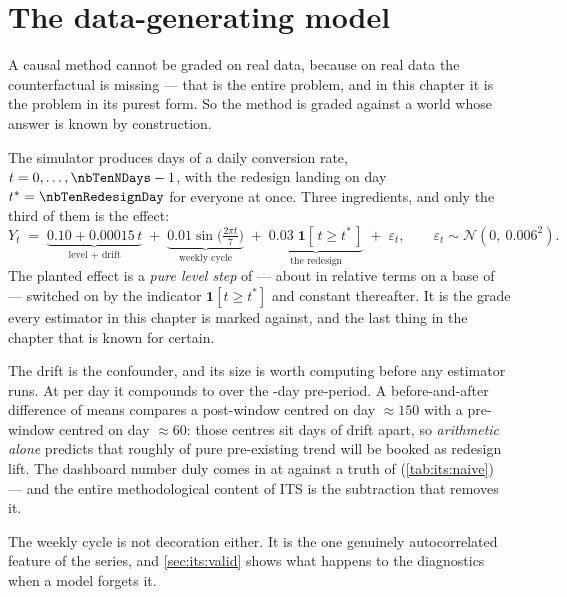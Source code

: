 \section{The data-generating model}
\label{sec:its:dgm}

A causal method cannot be graded on real data, because on real data the counterfactual is missing
--- that is the entire problem, and in this chapter it is the problem in its purest form. So the
method is graded against a world whose answer is known by construction.

The simulator produces \nbTenNDays{} days of a daily conversion rate,
$t = 0, \dots, \nbTenNDays-1$, with the redesign landing on day $t^{*} = \nbTenRedesignDay$ for
everyone at once. Three ingredients, and only the third of them is the effect:
%
\begin{equation}
  Y_t \;=\; \underbrace{0.10 + 0.00015\,t}_{\text{level {+} drift}}
        \;+\; \underbrace{0.01 \sin\!\Big(\tfrac{2\pi t}{7}\Big)}_{\text{weekly cycle}}
        \;+\; \underbrace{0.03\;\mathbf 1[\,t \ge t^{*}\,]}_{\text{the redesign}}
        \;+\; \varepsilon_t,
  \qquad \varepsilon_t \sim \mathcal N\!\left(0,\ 0.006^{2}\right).
  \label{eq:its:dgp}
\end{equation}
%
The planted effect is a \emph{pure level step} of \pp{+\nbTenTrueLift} --- about
\pc{\nbTenTrueLiftRel} in relative terms on a base of \pc{\nbTenBaseRate} --- switched on by the
indicator $\mathbf 1[t \ge t^{*}]$ and constant thereafter. It is the grade every estimator in
this chapter is marked against, and the last thing in the chapter that is known for certain.

The drift is the confounder, and its size is worth computing before any estimator runs. At
\pp{\nbTenDriftDay} per day it compounds to \pp{+\nbTenDriftPre} over the \nbTenNPre-day
pre-period. A before-and-after difference of means compares a post-window centred on day
$\approx 150$ with a pre-window centred on day $\approx 60$: those centres sit
\nbTenNaiveGapDays{} days of drift apart, so \emph{arithmetic alone} predicts that roughly
\pp{\nbTenNaiveTrendBias} of pure pre-existing trend will be booked as redesign lift. The
dashboard number duly comes in at \pp{\nbTenNaive} against a truth of \pp{+\nbTenTrueLift}
(\cref{tab:its:naive}) --- and the entire methodological content of ITS is the subtraction that
removes it.

The weekly cycle is not decoration either. It is the one genuinely autocorrelated feature of the
series, and \cref{sec:its:valid} shows what happens to the diagnostics when a model forgets it.

